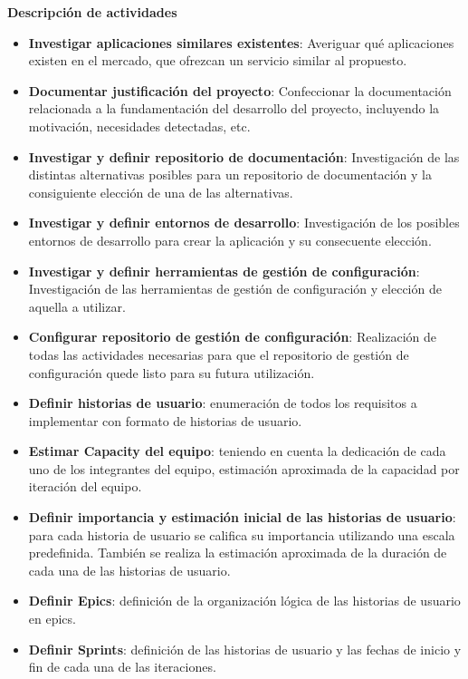 \textbf{Descripción de actividades}

\begin{itemize}
    \item{\textbf{Investigar aplicaciones similares existentes}:}
    Averiguar qué aplicaciones existen en el mercado, que ofrezcan un servicio similar al propuesto.
    \item{\textbf{Documentar justificación del proyecto}:}
    Confeccionar la documentación relacionada a la fundamentación del desarrollo del proyecto, incluyendo la motivación, necesidades detectadas, etc.
    \item{\textbf{Investigar y definir repositorio de documentación}:}
    Investigación de las distintas alternativas posibles para un repositorio de documentación y la consiguiente elección de una de las alternativas.
    \item{\textbf{Investigar y definir entornos de desarrollo}:}
    Investigación de los posibles entornos de desarrollo para crear la aplicación y su consecuente elección.
    \item{\textbf{Investigar y definir herramientas de gestión de configuración}:}
    Investigación de las herramientas de gestión de configuración y elección de aquella a utilizar.
    \item{\textbf{Configurar repositorio de gestión de configuración}:}
    Realización de todas las actividades necesarias para que el repositorio de gestión de configuración quede listo para su futura utilización. 
    \item{\textbf{Definir historias de usuario}:} 
    enumeración de todos los requisitos a implementar con formato de historias de usuario.
    \item{\textbf{Estimar Capacity del equipo}:}
    teniendo en cuenta la dedicación de cada uno de los integrantes del equipo, estimación aproximada de la capacidad por iteración del equipo.
    \item{\textbf{Definir importancia y estimación inicial de las historias de usuario}:}
    para cada historia de usuario se califica su importancia utilizando una escala predefinida. 
    También se realiza la estimación aproximada de la duración de cada una de las historias de usuario.
    \item{\textbf{Definir Epics}:}
    definición de la organización lógica de las historias de usuario en epics.
    \item{\textbf{Definir Sprints}:}
    definición de las historias de usuario y las fechas de inicio y fin de cada una de las iteraciones.

\end{itemize}
